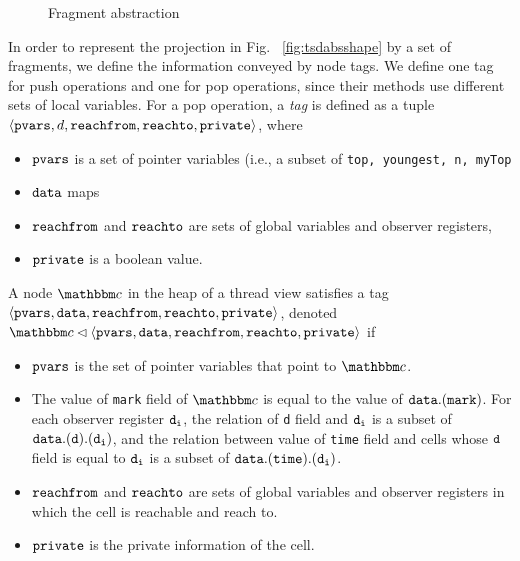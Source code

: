 \begin{figure}
	
\caption{Fragment abstraction}
\label{fig:tsviewshape}
\end{figure} 
In order to represent the projection in Fig. ~\ref{fig:tsdabsshape} by
a set of fragments, we define the information conveyed by node tags.
We define one tag for push operations and one for pop operations, since
their methods use different sets of local variables.
For a pop operation, a {\em tag} is defined as a tuple
$\left\langle\mathtt{pvars},d,\mathtt{reachfrom},\mathtt{reachto},\mathtt{private}\right\rangle$, where
\begin{itemize}
\item
  $\mathtt{pvars}$ is a set of pointer variables (i.e., a subset of
  {\tt top, youngest, n, myTop}
\item
  $\mathtt{data}$ maps
\item
  $\mathtt{reachfrom}$ and $\mathtt{reachto}$ are sets of global variables and observer registers, %
\item
  $\mathtt{private}$ is a boolean value.
\end{itemize}
A node $\cell$ in the heap of a thread view satisfies a tag $\left\langle\mathtt{pvars},\mathtt{data},\mathtt{reachfrom},\mathtt{reachto},\mathtt{private}\right\rangle$,
denoted $\cell \lhd \tagtuple$ if
\begin{itemize}
\item
  $\mathtt{pvars}$ is the set of pointer variables that point to $\cell$.
\item
The value of {\tt mark} field of $\cell$ is equal to the value of $\mathtt{data}\tt {.(mark)}$. For each observer register $\tt d_i$, the relation of {\tt d} field  and $\tt d_i$ is a subset of $\mathtt{data}\tt {.(d).(d_i)}$, and the relation between value of {\tt time} field and cells whose $\tt d$ field is equal to $\tt d_i$ is a subset of $\mathtt{data}\tt {.(time).(d_i)}$. 
\item $\mathtt{reachfrom}$ and $\mathtt{reachto}$ are sets of global variables and observer registers in which the cell is reachable and reach to.
\item $\mathtt{private}$ is the private information of the cell.
\end{itemize}

